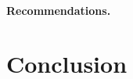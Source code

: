 \paragraph{Recommendations.} \RecommendationsText

\section{Conclusion}
\label{sec:conclusion}
\ConclusionText
